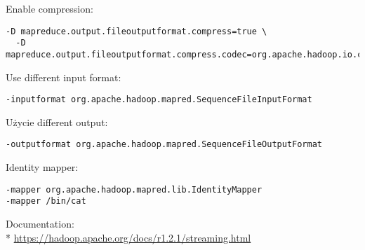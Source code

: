 \documentclass{article}
\begin{document}
Enable compression:
\begin{lstlisting}
-D mapreduce.output.fileoutputformat.compress=true \
  -D mapreduce.output.fileoutputformat.compress.codec=org.apache.hadoop.io.compress.GzipCodec
\end{lstlisting} 
Use different input format:
\begin{lstlisting}
-inputformat org.apache.hadoop.mapred.SequenceFileInputFormat
\end{lstlisting}
Użycie different output:
\begin{lstlisting}
-outputformat org.apache.hadoop.mapred.SequenceFileOutputFormat
\end{lstlisting}
Identity mapper:
\begin{lstlisting}
-mapper org.apache.hadoop.mapred.lib.IdentityMapper
-mapper /bin/cat
\end{lstlisting}

Documentation:
\\*
\url{https://hadoop.apache.org/docs/r1.2.1/streaming.html}
\end{document}
